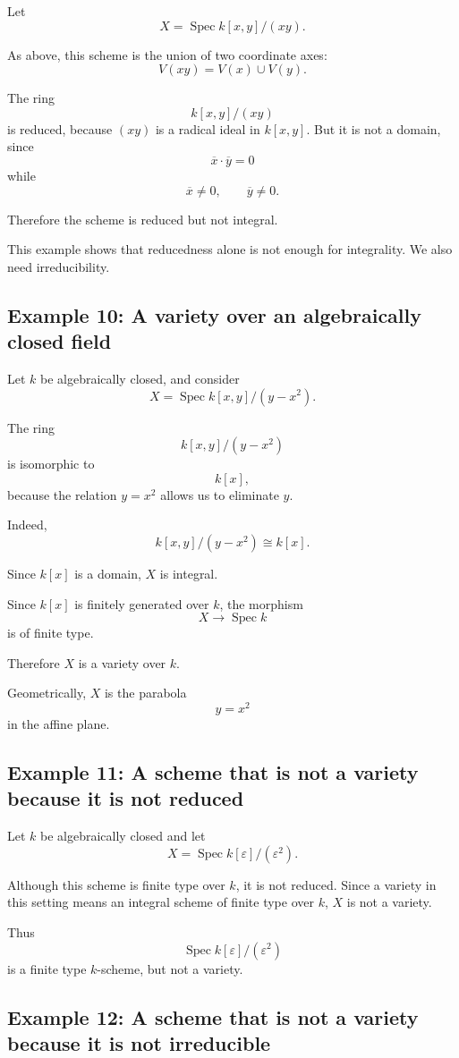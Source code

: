 \documentclass[12pt,a4paper]{article}
\theoremstyle{notespace}
\begin{document}
Let
\[
X=\operatorname{Spec} k[x,y]/(xy).
\]

As above, this scheme is the union of two coordinate axes:
\[
V(xy)=V(x)\cup V(y).
\]

The ring
\[
k[x,y]/(xy)
\]
is reduced, because \((xy)\) is a radical ideal in \(k[x,y]\). But it is not a domain, since
\[
\overline{x}\cdot \overline{y}=0
\]
while
\[
\overline{x}\neq 0,
\qquad
\overline{y}\neq 0.
\]

Therefore the scheme is reduced but not integral.

This example shows that reducedness alone is not enough for integrality. We also need irreducibility.

\subsection{Example 10: A variety over an algebraically closed field}

Let \(k\) be algebraically closed, and consider
\[
X=\operatorname{Spec} k[x,y]/(y-x^2).
\]

The ring
\[
k[x,y]/(y-x^2)
\]
is isomorphic to
\[
k[x],
\]
because the relation \(y=x^2\) allows us to eliminate \(y\).

Indeed,
\[
k[x,y]/(y-x^2)\cong k[x].
\]

Since \(k[x]\) is a domain, \(X\) is integral.

Since \(k[x]\) is finitely generated over \(k\), the morphism
\[
X\to \operatorname{Spec} k
\]
is of finite type.

Therefore \(X\) is a variety over \(k\).

Geometrically, \(X\) is the parabola
\[
y=x^2
\]
in the affine plane.

\subsection{Example 11: A scheme that is not a variety because it is not reduced}

Let \(k\) be algebraically closed and let
\[
X=\operatorname{Spec} k[\varepsilon]/(\varepsilon^2).
\]

Although this scheme is finite type over \(k\), it is not reduced. Since a variety in this setting means an integral scheme of finite type over \(k\), \(X\) is not a variety.

Thus
\[
\operatorname{Spec} k[\varepsilon]/(\varepsilon^2)
\]
is a finite type \(k\)-scheme, but not a variety.

\subsection{Example 12: A scheme that is not a variety because it is not irreducible}
\end{document}
